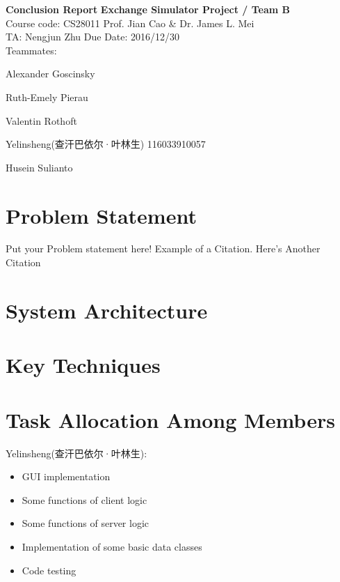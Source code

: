 \documentclass[a4paper, 11pt]{article}
\begin{document}
\noindent

\large\textbf{Conclusion Report}
\hfill \textbf{Exchange Simulator Project / Team B} \\

\normalsize Course code: CS28011 \hfill Prof. Jian Cao \& Dr. James L. Mei\\

TA: Nengjun Zhu  \hfill Due Date: 2016/12/30 \\

Teammates:

Alexander Goscinsky

Ruth-Emely Pierau

Valentin Rothoft

Yelinsheng(查汗巴依尔·叶林生) 116033910057

Husein Sulianto



\section*{Problem Statement}
Put your Problem statement here! Example of a Citation\cite[p.219]{Robotics}. Here's Another Citation\cite{Flueck}

\section*{System Architecture}
\lipsum[2]

\section*{Key Techniques}
\lipsum[3]

\section*{Task Allocation Among Members}

Yelinsheng(查汗巴依尔·叶林生):

\begin{itemize}
  \item GUI implementation
  \item Some functions of client logic
  \item Some functions of server logic
  \item Implementation of some basic data classes
  \item Code testing
\end{itemize}
\end{document}
